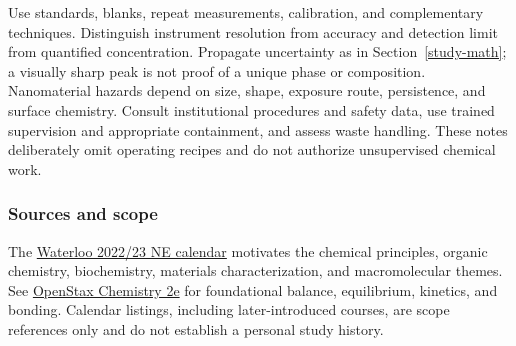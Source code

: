 Use standards, blanks, repeat measurements, calibration, and complementary techniques. Distinguish instrument resolution from accuracy and detection limit from quantified concentration. Propagate uncertainty as in Section~\ref{study-math}; a visually sharp peak is not proof of a unique phase or composition. Nanomaterial hazards depend on size, shape, exposure route, persistence, and surface chemistry. Consult institutional procedures and safety data, use trained supervision and appropriate containment, and assess waste handling. These notes deliberately omit operating recipes and do not authorize unsupervised chemical work.

\subsubsection{Sources and scope}
The \href{https://ucalendar.uwaterloo.ca/2223/COURSE/course-NE.html}{Waterloo 2022/23 NE calendar} motivates the chemical principles, organic chemistry, biochemistry, materials characterization, and macromolecular themes. See \href{https://openstax.org/details/books/chemistry-2e}{OpenStax Chemistry 2e} for foundational balance, equilibrium, kinetics, and bonding. Calendar listings, including later-introduced courses, are scope references only and do not establish a personal study history.